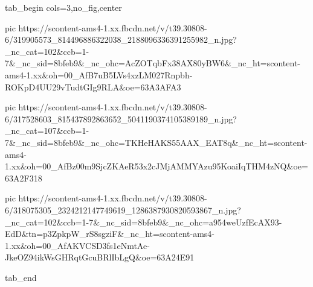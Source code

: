  
 
 
 
 


\ifcmt
  tab_begin cols=3,no_fig,center

     pic https://scontent-ams4-1.xx.fbcdn.net/v/t39.30808-6/319905573_814496886322038_2188096336391255982_n.jpg?_nc_cat=102&ccb=1-7&_nc_sid=8bfeb9&_nc_ohc=AcZOTqbFx38AX80yBW6&_nc_ht=scontent-ams4-1.xx&oh=00_AfB7uB5LVs4xzLM027Rnpbh-ROKpD4UU29vTudtGIg9RLA&oe=63A3AFA3

     pic https://scontent-ams4-1.xx.fbcdn.net/v/t39.30808-6/317528603_815437892863652_5041190374105389189_n.jpg?_nc_cat=107&ccb=1-7&_nc_sid=8bfeb9&_nc_ohc=TKHeHAKS55AAX_EAT8q&_nc_ht=scontent-ams4-1.xx&oh=00_AfBz00m9SjcZKAeR53x2cJMjAMMYAzu95KoaiIqTHM4zNQ&oe=63A2F318

     pic https://scontent-ams4-1.xx.fbcdn.net/v/t39.30808-6/318075305_2324212147749619_1286387930820593867_n.jpg?_nc_cat=102&ccb=1-7&_nc_sid=8bfeb9&_nc_ohc=a954weUzfEcAX93-EdD&tn=p3ZpkpW_rS8sgziF&_nc_ht=scontent-ams4-1.xx&oh=00_AfAKVCSD3fs1eNmtAe-JkeOZ94ikWsGHRqtGcuBRlIbLgQ&oe=63A24E91

  tab_end
\fi
